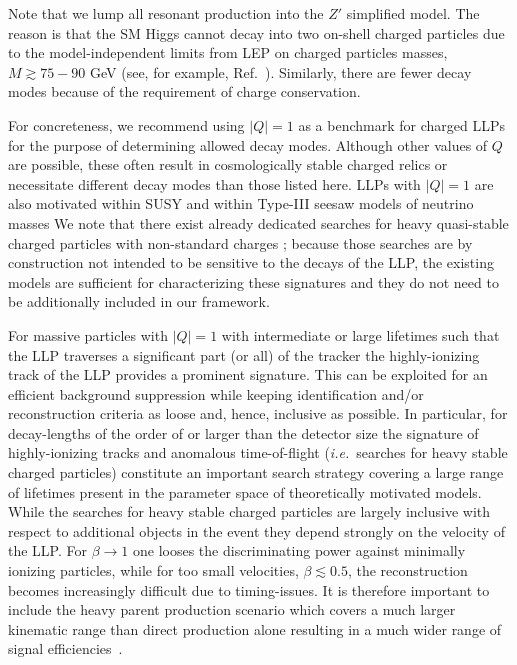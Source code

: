  Note that we lump all resonant production into the $Z'$ simplified model.  The reason is that the SM Higgs cannot decay into two on-shell charged particles due to the model-independent limits from LEP on charged particles masses, $M\gtrsim75-90$ GeV (see, for example, Ref.~\cite{Abbiendi:2003yd}).   Similarly, there are fewer decay modes because of the requirement of charge conservation. 

For concreteness, we recommend using $|Q|=1$ as a benchmark for charged LLPs for the purpose of determining allowed decay modes. 
Although other values of $Q$ are possible, these often result in cosmologically stable charged relics or necessitate different decay modes than those listed here.   LLPs with $|Q|=1$ are also motivated within SUSY \cite{Chen:1995yu,Thomas:1998wy,Feng:1999fu} and 
within Type-III seesaw models of neutrino masses \cite{Bajc:2006ia,Bajc:2007zf,Franceschini:2008pz,Arhrib:2009mz}
We note that there exist already dedicated searches for heavy quasi-stable charged particles with non-standard charges \cite{Aad:2015kta,Khachatryan:2016sfv}; because those searches are by construction not intended to be sensitive to the decays of the LLP, the existing models are sufficient for characterizing these signatures and they do not need to be additionally included in our framework.

For massive particles with $|Q|=1$ with intermediate or large lifetimes such that the LLP traverses a significant part (or all) of the tracker the highly-ionizing track of the LLP provides a prominent signature. This can be exploited for an efficient background suppression while keeping identification and/or reconstruction criteria as loose and, hence, inclusive as possible. In particular, for decay-lengths of the order of or larger than the detector size the signature of highly-ionizing tracks and anomalous time-of-flight (\emph{i.e.}~searches for heavy stable charged particles) constitute an important search strategy covering a large range of lifetimes present in the parameter space of theoretically motivated models. While the searches for heavy stable charged particles are largely inclusive with respect to additional objects in the event they depend strongly on the velocity of the LLP\@. For $\beta\to1$ one looses the discriminating power against minimally ionizing particles, while for too small velocities, $\beta\lesssim0.5$, the reconstruction becomes increasingly difficult due to timing-issues. It is therefore important to include the heavy parent production scenario which covers a much larger kinematic range than direct production alone resulting in a much wider range of signal efficiencies~\cite{Heisig:2015yla}.


